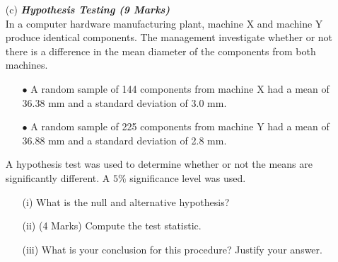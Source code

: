 \documentclass[]{article}
\begin{document}
\begin{itemize}
\bigskip
\item[(c)]  \textbf{\textit{Hypothesis Testing (9 Marks)}}\\
In a computer hardware manufacturing plant, machine X and machine Y produce identical components. The management investigate whether or not there is a difference in the mean diameter of the components from both machines.

\begin{itemize}
\item[$\bullet$] A random sample of 144 components from machine X had a mean of 36.38 mm and a standard deviation of 3.0 mm.
\item[$\bullet$] A random sample of 225 components from machine Y had a mean of 36.88 mm and a standard deviation of 2.8 mm.
\end{itemize}
A hypothesis test was used to determine whether or not the means are significantly different.
A $5\%$ significance level was used.

\begin{itemize}
\item[(i)]  What is the null and alternative hypothesis?
\item[(ii)] (4 Marks) Compute the test statistic.
\item[(iii)]  What is your conclusion for this procedure? Justify your answer.
\end{itemize}

\end{itemize}
\end{document}
